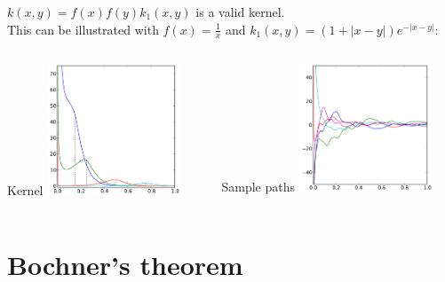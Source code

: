 \begin{frame}{}
\begin{example}
$k(x,y) = f(x)f(y)k_1(x,y)$ is a valid kernel.\\
\vspace{0.5cm}
This can be illustrated with $f(x) = \frac1x$ and $k_1(x,y) = (1 + |x-y|) e^{-|x-y|}$:\\
\begin{columns}[c]
\begin{column}{5cm}
\begin{center}
Kernel
\includegraphics[width=4cm]{3_gaussian_process_regression/figures/python/newfromold-prodfunc-k}
\end{center}
\end{column}
\begin{column}{5cm}
\begin{center}
Sample paths
\includegraphics[width=4cm]{3_gaussian_process_regression/figures/python/newfromold-prodfunc-traj}
\end{center}
\end{column}
\end{columns}
\end{example}
\end{frame}


\section[Bochner]{Bochner's theorem}
\subsection{}

